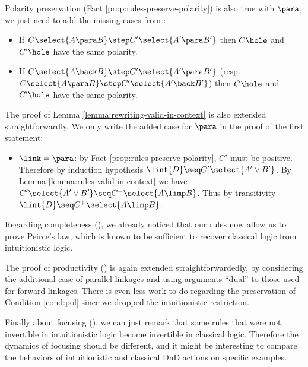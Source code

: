 Polarity preservation (Fact \ref{prop:rules-preserve-polarity}) is also true
with $\para$, we just need to add the missing cases from :
\begin{itemize}
  \item If $C\select{A \para B} \step C'\select{A' \para B'}$ then $C\hole$ and
  $C'\hole$ have the same polarity.
  \item If $C\select{A \back B} \step C'\select{A' \para B'}$ (resp. $C\select{A
  \para B} \step C'\select{A' \back B'}$) then $C\hole$ and $C'\hole$ have the
  same polarity.
\end{itemize}
The proof of Lemma \ref{lemma:rewriting-valid-in-context} is also extended
straightforwardly. We only write the added case for $\para$ in the proof of the
first statement:
\begin{itemize}
  \item $\link = \para$: by Fact \ref{prop:rules-preserve-polarity}, $C'$ must
  be positive. Therefore by induction hypothesis $\lint{D} \seq C'\select{A'
  \lor B'}$. By Lemma \ref{lemma:rules-valid-in-context} we have
  $C'\select{A' \lor B'} \seq C^+\select{A \limp B}$. Thus by transitivity
  $\lint{D} \seq C^+\select{A \limp B}$.
\end{itemize}

Regarding completeness (), we already noticed that our
rules now allow us to prove Peirce's law, which is known to be sufficient to
recover classical logic from intuitionistic logic.

The proof of productivity () is again extended
straightforwardedly, by considering the additional case of parallel linkages and
using arguments ``dual'' to those used for forward linkages. There is even less
work to do regarding the preservation of Condition \ref{cond:pol} since we
dropped the intuitionistic restriction.

Finally about focusing (), we can just remark that some rules
that were not invertible in intuitionistic logic become invertible in classical
logic. Therefore the dynamics of focusing should be different, and it might be
interesting to compare the behaviors of intuitionistic and classical DnD actions
on specific examples.